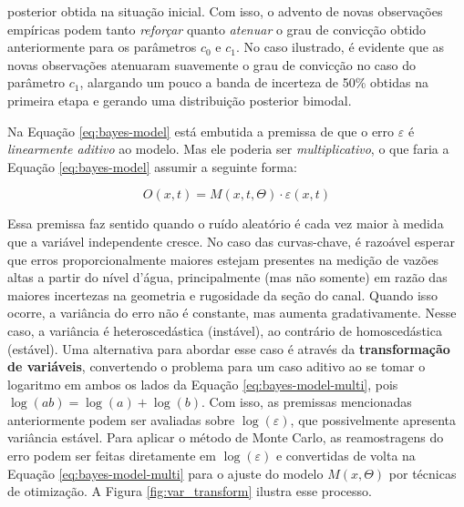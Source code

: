 \documentclass[./main.tex]{subfiles}
\begin{document}
posterior obtida na situação inicial. Com isso, o advento de novas observações empíricas podem tanto \textit{reforçar} quanto \textit{atenuar} o grau de convicção obtido anteriormente para os parâmetros $c_0$ e $c_1$. No caso ilustrado, é evidente que as novas observações atenuaram suavemente o grau de convicção no caso do parâmetro $c_1$, alargando um pouco a banda de incerteza de 50\% obtidas na primeira etapa e gerando uma distribuição posterior bimodal. 

\par Na Equação \eqref{eq:bayes-model} está embutida a premissa de que o erro $\varepsilon$ é \textit{linearmente aditivo} ao modelo. Mas ele poderia ser \textit{multiplicativo}, o que faria a Equação \eqref{eq:bayes-model} assumir a seguinte forma:
\begin{linenomath*}
\begin{equation}
\label{eq:bayes-model-multi}
    O(x, t) = M(x, t, \Theta) \cdot \varepsilon(x, t)
\end{equation}
\end{linenomath*}
Essa premissa faz sentido quando o ruído aleatório é cada vez maior à medida que a variável independente cresce. No caso das curvas-chave, é razoável esperar que erros proporcionalmente maiores estejam presentes na medição de vazões altas a partir do nível d'água, principalmente (mas não somente) em razão das maiores incertezas na geometria e rugosidade da seção do canal. Quando isso ocorre, a variância do erro não é constante, mas aumenta gradativamente. Nesse caso, a variância é heteroscedástica (instável), ao contrário de homoscedástica (estável). Uma alternativa para abordar esse caso é através da \textbf{transformação de variáveis}, convertendo o problema para um caso aditivo ao se tomar o logaritmo em ambos os lados da Equação \eqref{eq:bayes-model-multi}, pois $\log(ab) = \log(a) + \log(b)$. Com isso, as premissas  mencionadas anteriormente podem ser avaliadas sobre $\log(\varepsilon)$, que possivelmente apresenta variância estável. Para aplicar o método de Monte Carlo, as reamostragens do erro podem ser feitas diretamente em $\log(\varepsilon)$ e convertidas de volta na Equação \eqref{eq:bayes-model-multi} para o ajuste do modelo $M(x, \Theta)$ por técnicas de otimização. A Figura \ref{fig:var_transform} ilustra esse processo.
\end{document}
